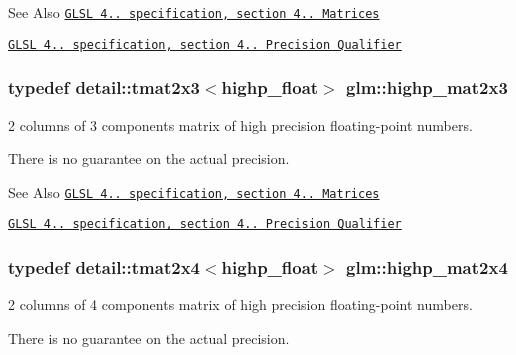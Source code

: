 \begin{DoxySeeAlso}{See Also}
\href{http://www.opengl.org/registry/doc/GLSLangSpec.4.20.8.pdf}{\tt G\-L\-S\-L 4.. specification, section 4.. Matrices} 

\href{http://www.opengl.org/registry/doc/GLSLangSpec.4.20.8.pdf}{\tt G\-L\-S\-L 4.. specification, section 4.. Precision Qualifier} 
\end{DoxySeeAlso}
\hypertarget{group__core__precision_ga89136b699656886b0941c95cf2778da3}{
\subsubsection[{highp\-\_\-mat2x3}]{\setlength{\rightskip}{0pt plus 5cm}typedef detail\-::tmat2x3$<$highp\-\_\-float$>$ {\bf glm\-::highp\-\_\-mat2x3}}}\label{group__core__precision_ga89136b699656886b0941c95cf2778da3}


2 columns of 3 components matrix of high precision floating-\/point numbers. 

There is no guarantee on the actual precision.

\begin{DoxySeeAlso}{See Also}
\href{http://www.opengl.org/registry/doc/GLSLangSpec.4.20.8.pdf}{\tt G\-L\-S\-L 4.. specification, section 4.. Matrices} 

\href{http://www.opengl.org/registry/doc/GLSLangSpec.4.20.8.pdf}{\tt G\-L\-S\-L 4.. specification, section 4.. Precision Qualifier} 
\end{DoxySeeAlso}
\hypertarget{group__core__precision_ga41deb7c45e9219ccccdc011aafd42f27}{
\subsubsection[{highp\-\_\-mat2x4}]{\setlength{\rightskip}{0pt plus 5cm}typedef detail\-::tmat2x4$<$highp\-\_\-float$>$ {\bf glm\-::highp\-\_\-mat2x4}}}\label{group__core__precision_ga41deb7c45e9219ccccdc011aafd42f27}


2 columns of 4 components matrix of high precision floating-\/point numbers. 

There is no guarantee on the actual precision.

